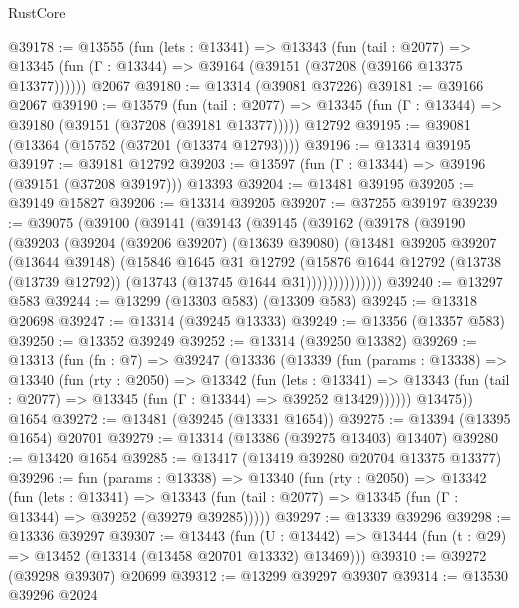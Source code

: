 \begin{lexlean}{RustCore}
\begin{coremodule}
@39178 := @13555
    (fun (lets : @13341) =>
    @13343
      (fun (tail : @2077) =>
      @13345 (fun (Γ : @13344) => @39164 (@39151 (@37208 (@39166 @13375 @13377))))))
    @2067
@39180 := @13314 (@39081 @37226)
@39181 := @39166 @2067
@39190 := @13579
    (fun (tail : @2077) => @13345 (fun (Γ : @13344) => @39180 (@39151 (@37208 (@39181 @13377)))))
    @12792
@39195 := @39081 (@13364 (@15752 (@37201 (@13374 @12793))))
@39196 := @13314 @39195
@39197 := @39181 @12792
@39203 := @13597 (fun (Γ : @13344) => @39196 (@39151 (@37208 @39197))) @13393
@39204 := @13481 @39195
@39205 := @39149 @15827
@39206 := @13314 @39205
@39207 := @37255 @39197
@39239 := @39075
    (@39100
      (@39141
        (@39143
          (@39145
            (@39162
              (@39178
                (@39190
                  (@39203
                    (@39204
                      (@39206 @39207)
                      (@13639 @39080)
                      (@13481
                        @39205
                        @39207
                        (@13644 @39148)
                        (@15846
                          @1645
                          @31
                          @12792
                          (@15876
                            @1644
                            @12792
                            (@13738 (@13739 @12792))
                            (@13743 (@13745 @1644 @31))))))))))))))
@39240 := @13297 @583
@39244 := @13299 (@13303 @583) (@13309 @583)
@39245 := @13318 @20698
@39247 := @13314 (@39245 @13333)
@39249 := @13356 (@13357 @583)
@39250 := @13352 @39249
@39252 := @13314 (@39250 @13382)
@39269 := @13313
    (fun (fn : @7) =>
    @39247
      (@13336
        (@13339
          (fun (params : @13338) =>
          @13340
            (fun (rty : @2050) =>
            @13342
              (fun (lets : @13341) =>
              @13343 (fun (tail : @2077) => @13345 (fun (Γ : @13344) => @39252 @13429))))))
        @13475))
    @1654
@39272 := @13481 (@39245 (@13331 @1654))
@39275 := @13394 (@13395 @1654) @20701
@39279 := @13314 (@13386 (@39275 @13403) @13407)
@39280 := @13420 @1654
@39285 := @13417 (@13419 @39280 @20704 @13375 @13377)
@39296 := fun (params : @13338) =>
  @13340
    (fun (rty : @2050) =>
    @13342
      (fun (lets : @13341) =>
      @13343 (fun (tail : @2077) => @13345 (fun (Γ : @13344) => @39252 (@39279 @39285)))))
@39297 := @13339 @39296
@39298 := @13336 @39297
@39307 := @13443
    (fun (U : @13442) => @13444 (fun (t : @29) => @13452 (@13314 (@13458 @20701 @13332) @13469)))
@39310 := @39272 (@39298 @39307) @20699
@39312 := @13299 @39297 @39307
@39314 := @13530 @39296 @2024

\end{coremodule}
\end{lexlean}
